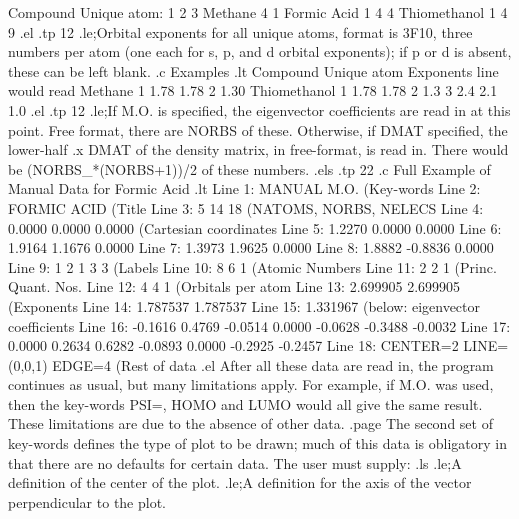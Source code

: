      Compound   Unique atom:  1  2  3
     Methane                  4  1
     Formic Acid              1  4  4
     Thiomethanol             1  4  9
.el
.tp 12
.le;Orbital exponents for all unique atoms, format is 3F10, three numbers
per atom (one each for s, p, and d orbital exponents); if p or d is absent, these
can be left blank.
.c
 Examples
.lt
    Compound         Unique atom       Exponents line would read
     Methane              1        1.78       1.78
                          2        1.30
     Thiomethanol         1        1.78       1.78
                          2        1.3
                          3        2.4        2.1        1.0
.el
.tp 12
.le;If M.O.  is specified, the eigenvector coefficients are read in
at this point. Free format, there
are NORBS of these. Otherwise, if DMAT specified, the lower-half
.x DMAT
of the density matrix, in free-format, is read in. There would be 
(NORBS_*(NORBS+1))/2 of these numbers.
.els
.tp 22
.c
Full Example of Manual Data for Formic Acid
.lt
Line  1:      MANUAL       M.O.                   (Key-words
Line  2:      FORMIC ACID                         (Title
Line  3:      5  14 18                            (NATOMS, NORBS, NELECS
Line  4:   0.0000    0.0000    0.0000             (Cartesian coordinates
Line  5:   1.2270    0.0000    0.0000
Line  6:   1.9164    1.1676    0.0000
Line  7:   1.3973    1.9625    0.0000
Line  8:   1.8882   -0.8836    0.0000
Line  9:    1 2 1 3 3                             (Labels
Line 10:    8 6 1                                 (Atomic Numbers
Line 11:    2 2 1                                 (Princ. Quant. Nos.
Line 12:    4 4 1                                 (Orbitals per atom
Line 13:   2.699905  2.699905                     (Exponents
Line 14:   1.787537  1.787537  
Line 15:   1.331967                    (below: eigenvector coefficients
Line 16:   -0.1616  0.4769  -0.0514   0.0000  -0.0628  -0.3488  -0.0032  
Line 17:    0.0000  0.2634   0.6282  -0.0893   0.0000  -0.2925  -0.2457  
Line 18:    CENTER=2 LINE=(0,0,1) EDGE=4          (Rest of data
.el
 After all these data are read in, the program continues as usual, but many
limitations apply. For example, if M.O. was used, then the key-words PSI=,
HOMO and LUMO would all give the same result.
These limitations are due to the absence of other data.
.page
 The second set of key-words defines the type of plot to be drawn; much
of this data is obligatory in that there are no defaults for certain data.
The user must supply:
.ls
.le;A definition of the center of the plot.
.le;A definition for the axis of the vector perpendicular to the plot.
